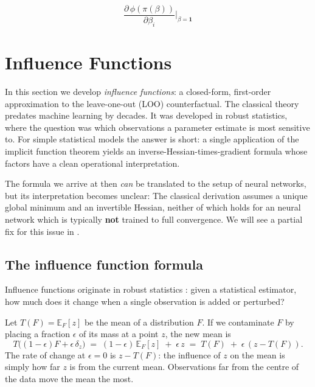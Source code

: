 \documentclass[11pt]{article}
\begin{document}
\begin{equation}\label{eq:holy-grail}
  \boxed{\;\frac{\partial\,\phi(\pi(\beta))}{\partial \beta_i}\bigg|_{\beta = \mathbf{1}}\;}
\end{equation}





\section{Influence Functions}\label{sec:influence}

In this section we develop \emph{influence functions}: a closed-form, first-order approximation to the leave-one-out (LOO) counterfactual. The classical theory \citep{hampel1974,cook1977} predates machine learning by decades. It was developed in robust statistics, where the question was which observations a parameter estimate is most sensitive to. For simple statistical models the answer is short: a single application of the implicit function theorem yields an inverse-Hessian-times-gradient formula whose factors have a clean operational interpretation.

The formula we arrive at then \emph{can} be translated to the setup of neural networks, but its interpretation becomes unclear: The classical derivation assumes a unique global minimum and an invertible Hessian, neither of which holds for an neural network which is typically \textbf{not} trained to full convergence. We will see a partial fix for this issue in .

\subsection{The influence function formula}\label{subsec:if-formula}

Influence functions originate in robust statistics \citep{hampel1974}: given a statistical estimator, how much does it change when a single observation is added or perturbed?

\begin{example}\label{ex:mean-if}
Let $T(F) = \mathbb{E}_F[z]$ be the mean of a distribution $F$. If we contaminate $F$ by placing a fraction $\epsilon$ of its mass at a point $z$, the new mean is
\[
  T\bigl((1-\epsilon)F + \epsilon\,\delta_z\bigr) \;=\; (1-\epsilon)\,\mathbb{E}_F[z] \;+\; \epsilon\,z \;=\; T(F) \;+\; \epsilon\,(z - T(F)).
\]
The rate of change at $\epsilon = 0$ is $z - T(F)$: the influence of $z$ on the mean is simply how far $z$ is from the current mean. Observations far from the centre of the data move the mean the most.
\end{example}
\end{document}
